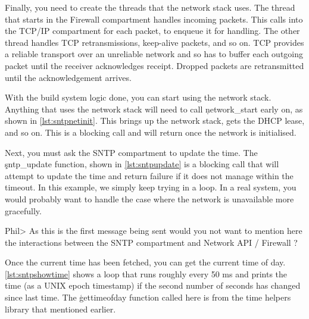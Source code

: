 \lualisting[filename=examples/sntp/xmake.lua,marker=network_stack_deps,label=lst:xmakenetdeps,caption="Build system code for adding dependencies on the network stack."]{}

Finally, you need to create the threads that the network stack uses.
The thread that starts in the Firewall compartment handles incoming packets.
This calls into the TCP/IP compartment for each packet, to enqueue it for handling.
The other thread handles TCP retransmissions, keep-alive packets, and so on.
TCP provides a reliable transport over an unreliable network and so has to buffer each outgoing packet until the receiver acknowledges receipt.
Dropped packets are retransmitted until the acknowledgement arrives.

\lualisting[filename=examples/sntp/xmake.lua,marker=network_stack_threads,label=lst:xmakenetthreads,caption="Build system code for defining the network stack's threads."]{}

With the build system logic done, you can start using the network stack.
Anything that uses the network stack will need to call \c{network_start} early on, as shown in \ref{lst:sntpnetinit}.
This brings up the network stack, gets the DHCP lease, and so on.
This is a blocking call and will return once the network is initialised.

\codelisting[filename=examples/sntp/sntp.cc,marker=network_init,label=lst:sntpnetinit,caption="Initialisation for the network stack."]{}

Next, you must ask the SNTP compartment to update the time.
The \c{sntp_update} function, shown in \ref{lst:sntpupdate} is a blocking call that will attempt to update the time and return failure if it does not manage within the timeout.
In this example, we simply keep trying in a loop.
In a real system, you would probably want to handle the case where the network is unavailable more gracefully.

\codelisting[filename=examples/sntp/sntp.cc,marker=sntp_update,label=lst:sntpupdate,caption="Updating the time from the SNTP server."]{}

Phil> As this is the first message being sent would you not want to mention here the interactions between the SNTP compartment and Network API / Firewall ?    

Once the current time has been fetched, you can get the current time of day.
\ref{lst:sntpshowtime} shows a loop that runs roughly every 50 ms and prints the time (as a UNIX epoch timestamp) if the second number of seconds has changed since last time.
The \c{gettimeofday} function called here is from the time helpers library that mentioned earlier.

